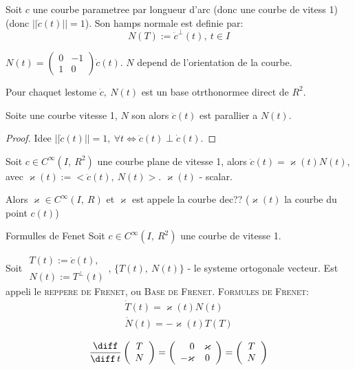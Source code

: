 \begin{definition}
	Soit $c$ une courbe parametree par longueur d'arc (donc une courbe de vitess 1) (donc $||\dot{c}(t)||=1$). Son hamps normale est definie par:
	$$N(T):=\dot{c}^\perp(t),\ t\in I$$
\end{definition}

\begin{remark}
$N(t)=\left(\begin{array}{cr} 0 & -1 \\ 1 & 0\end{array}\right)\dot{c}(t)$. $N$ depend de l'orientation de la courbe.
\end{remark}

Pour chaquet lestome ${\dot{c},\ N(t)}$ est un base otrthonormee direct de $R^2$.

\begin{lemme}
	Soite une courbe vitesse 1, $N$ son alors $\ddot{c}(t)$ est parallier a $N(t)$.
\end{lemme}
\begin{proof}
	Idee $||\dot{c}(t)||=1,\ \forall t \Longleftrightarrow \ddot{c}(t)\perp\dot{c}(t)$.
\end{proof}

\begin{definition}
	Soit $c\in C^\infty(I,\ R^2)$ une courbe plane de vitesse 1, alors $\ddot{c}(t)=\varkappa(t)N(t)$, avec $\varkappa(t):=<\ddot{c}(t),\ N(t)>$.
	$\varkappa(t)$ - scalar.
	
	Alors $\varkappa\in C^\infty (I,\ R)$ et $\varkappa$ est appele la courbe dec?? ($\varkappa(t)$ la courbe du point $c(t)$)
\end{definition}

\begin{theorem}{Formulles de Fenet}
	Soit $c\in C^\infty(I,\ R^2)$ une courbe de vitesse 1.
	
	Soit $\begin{array}{c}T(t):=\dot{c}(t),\\ N(t):=T^\perp (t) \end{array}$, $\{T(t),\ N(t)\}$ - le systeme ortogonale vecteur. Est appeli le \textsc{reppere de Frenet}, ou \textsc{Base de Frenet}. \textsc{Formules de Frenet}:
	$$\begin{array}{c}\dot{T}(t)=\varkappa(t)N(t)\\ \dot{N}(t)=-\varkappa(t)T(T)\end{array}$$
\end{theorem}

\begin{remark}
	$$\frac{\diff}{\diff\, t}\left(
	\begin{array}{c}
		T\\N\end{array}\right) = \left(\begin{array}{rc}0 & \varkappa\\
		-\varkappa & 0
	\end{array}
	\right)=\left(\begin{array}{c}T\\N\end{array}\right)$$
\end{remark}

